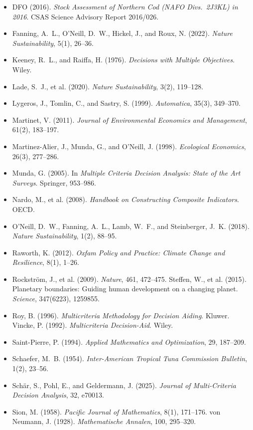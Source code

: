 \documentclass[preprint,11pt,authoryear]{elsarticle}
\theoremstyle{remark}
\begin{document}
\begin{itemize}[leftmargin=1.5em,itemsep=1pt]
\item DFO (2016). \emph{Stock Assessment of Northern Cod (NAFO Divs.\ 2J3KL) in 2016}. CSAS Science Advisory Report 2016/026.
\item Fanning, A.~L., O'Neill, D.~W., Hickel, J., and Roux, N. (2022). \emph{Nature Sustainability}, 5(1), 26--36.
\item Keeney, R.~L., and Raiffa, H. (1976). \emph{Decisions with Multiple Objectives}. Wiley.
\item Lade, S.~J., et al. (2020). \emph{Nature Sustainability}, 3(2), 119--128.
\item Lygeros, J., Tomlin, C., and Sastry, S. (1999). \emph{Automatica}, 35(3), 349--370.
\item Martinet, V. (2011). \emph{Journal of Environmental Economics and Management}, 61(2), 183--197.
\item Martinez-Alier, J., Munda, G., and O'Neill, J. (1998). \emph{Ecological Economics}, 26(3), 277--286.
\item Munda, G. (2005). In \emph{Multiple Criteria Decision Analysis: State of the Art Surveys}. Springer, 953--986.
\item Nardo, M., et al. (2008). \emph{Handbook on Constructing Composite Indicators}. OECD.
\item O'Neill, D.~W., Fanning, A.~L., Lamb, W.~F., and Steinberger, J.~K. (2018). \emph{Nature Sustainability}, 1(2), 88--95.
\item Raworth, K. (2012). \emph{Oxfam Policy and Practice: Climate Change and Resilience}, 8(1), 1--26.
\item Rockstr\"om, J., et al. (2009). \emph{Nature}, 461, 472--475. Steffen, W., et al. (2015). Planetary boundaries: Guiding human development on a changing planet. \emph{Science}, 347(6223), 1259855.
\item Roy, B. (1996). \emph{Multicriteria Methodology for Decision Aiding}. Kluwer. Vincke, P. (1992). \emph{Multicriteria Decision-Aid}. Wiley.
\item Saint-Pierre, P. (1994). \emph{Applied Mathematics and Optimization}, 29, 187--209.
\item Schaefer, M.~B. (1954). \emph{Inter-American Tropical Tuna Commission Bulletin}, 1(2), 23--56.
\item Sch\"ar, S., Pohl, E., and Geldermann, J. (2025). \emph{Journal of Multi-Criteria Decision Analysis}, 32, e70013.
\item Sion, M. (1958). \emph{Pacific Journal of Mathematics}, 8(1), 171--176. von Neumann, J. (1928). \emph{Mathematische Annalen}, 100, 295--320.
\end{itemize}
\end{document}
